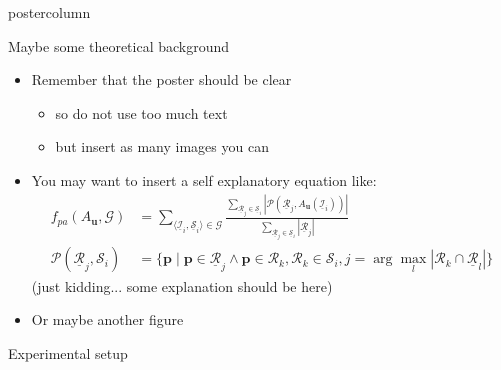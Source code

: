 \documentclass[final,hyperref={pdfpagelabels=false}]{beamer}
\begin{document}
\begin{frame}
\begin{columns}
\begin{column}{.49\textwidth}
\begin{beamercolorbox}[center,wd=\textwidth]{postercolumn}
\begin{minipage}[T]{.95\textwidth}
{
            \vfill
            \begin{block}{Maybe some theoretical background}
              \begin{itemize}
              \item Remember that the poster should be clear
                \begin{itemize}
                \item so do not use too much text
                \item but insert as many images you can
                \end{itemize}
              \item You may want to insert a self explanatory equation like:
                \begin{align*}
                  f_{pa}(A_\mathbf{u},\mathcal{G}) &=
                  \sum_{\langle\underline{\mathcal{I}}_i,
                               \underline{\mathcal{S}}_i\rangle\in\mathcal{G}}
                  \frac{\displaystyle\sum_{\underline{\mathcal{R}}_j\in\underline{\mathcal{S}}_i}
                    \left|
                      \mathcal{P}(\underline{\mathcal{R}}_{j},
                                  A_\mathbf{u}(\underline{\mathcal{I}}_i))
                    \right|}
                  {\displaystyle
                    \sum_{\underline{\mathcal{R}}_{j} \in \underline{\mathcal{S}}_i}|
                    \underline{\mathcal{R}}_{j}|}\\
                  \mathcal{P}(\underline{\mathcal{R}}_{j},\mathcal{S}_i) &=
                  \Big\{         
                  \mathbf{p} \mid 
                  \mathbf{p}\!\in\! \underline{\mathcal{R}}_{j}
                  \wedge 
                  \mathbf{p}\!\in\!\mathcal{R}_{k}, 
                  \mathcal{R}_{k}\!\in\!\mathcal{S}_i,
                  j=\arg\max_l | \mathcal{R}_{k}{\cap}\underline{\mathcal{R}}_{l} |
                  \Big\}
                \end{align*}
                (just kidding... some explanation should be here)
              \item Or maybe another figure
              \end{itemize}
            \end{block}
            \vfill
            \begin{block}{Experimental setup}

\end{block}}
\end{minipage}
\end{beamercolorbox}
\end{column}
\end{columns}
\end{frame}
\end{document}
